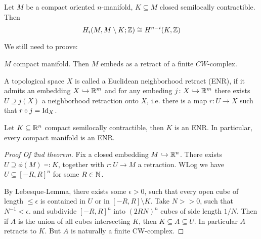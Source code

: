 \documentclass[language=english]{TemplateLecture}
\begin{document}

\begin{thm}{}{}
    Let \(M\) be a compact oriented \(n\)-manifold, \(K \subseteq M\) closed semilocally contractible. Then
    \[H_i(M, M\setminus K; \mathbb{Z}) \cong H^{n-i}(K, \mathbb{Z})\]
\end{thm}

We still need to proove:

\begin{thm}{}{}
    \(M\) compact manifold. Then \(M\) embeds as a retract of a finite \(CW\)-complex.
\end{thm}

\begin{defi}{}{}
    A topological space \(X\) is called a Euclidean neighborhood retract (ENR), if it admits an embedding \(X \hookrightarrow \mathbb{R}^m\) and for any embeding \(j\colon X \hookrightarrow \mathbb{R}^m\) there exists \(U \supseteq j(X)\) a neighborhood retraction onto \(X\), i.e. there is a map \(r\colon U \to X\) such that \(r \circ j = \operatorname{Id}_X\).
\end{defi}

\begin{thm}{}{}
    Let \(K \subseteq \mathbb{R}^n\) compact semilocally contractible, then \(K\) is an ENR. In particular, every compact manifold is an ENR.
\end{thm}

\begin{proof}[Proof Of 2nd theorem]
    Fix a closed embedding \(M \hookrightarrow \mathbb{R}^n\). There exists \(U \supseteq \phi(M) \eqcolon K\), together with \(r\colon U \to M\) a retraction. WLog we have \(U \subseteq [-R, R]^n\) for some \(R\in \mathbb{N}\).
    
    By Lebesque-Lemma, there exists some \(\epsilon > 0\), such that every open cube of length \(\leq \epsilon\) is contained in \(U\) or in \([-R , R]\setminus K\). Take \(N >> 0\), such that \(N^{-1} < \epsilon\). and subdivide \([-R, R]^n\) into \((2RN)^n\) cubes of side length \(1/N\). Then if \(A\) is the union of all cubes intersecting \(K\), then \(K \subseteq A \subseteq U\). In particular \(A\) retracts to \(K\). But \(A\) is naturally a finite CW-complex.
\end{proof}
\end{document}
